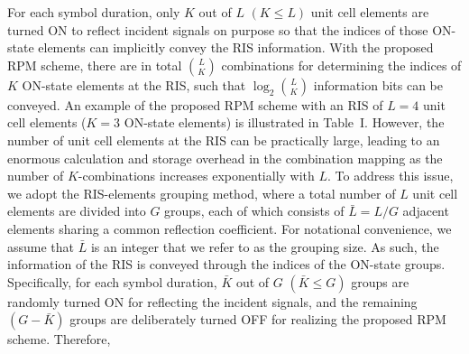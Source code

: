 \documentclass[draftclsnofoot,onecolumn,12pt]{IEEEtran}
\newcommand{\rev}[1]{{\color{red}#1}} %
\newcommand{\rev}[1]{#1}
\begin{document}
For each symbol duration, only $K$ out of $L$ $(K\le L)$ unit cell elements are turned ON to reflect incident signals on purpose so that the indices of those ON-state elements can implicitly convey the RIS information. 
With the proposed RPM scheme, 
there are in total ${{L}\choose{K}} $ combinations for determining the indices of $K$ ON-state elements at the RIS, such that  $\log_2 {{L}\choose{K}}$ information bits can be conveyed. 
An example of the proposed RPM scheme with an RIS of $L=4$ unit cell elements ($K=3$ ON-state elements) is illustrated in Table~I. 
However, the number of unit cell elements at the RIS can be practically large, leading to an enormous calculation and storage overhead in the combination mapping as the number of $K$-combinations increases exponentially with $L$. 
To address this issue, we adopt the RIS-elements grouping method, 
where a total number of $L$ unit cell elements are divided into $G$ groups, each of which consists of ${\bar L}=L/G$ adjacent elements sharing 
a common reflection coefficient. 
For notational convenience, we assume that ${\bar L}$ is an integer that we refer to as the grouping size. 
As such, the information of the RIS is conveyed through the indices of the ON-state groups. Specifically, for each symbol duration, ${\bar K}$ out of $G$ $(\bar{K}\le G)$ groups are randomly turned ON for reflecting the incident signals, and the remaining $(G-\bar K)$ groups are deliberately turned OFF for realizing the proposed RPM scheme. 
Therefore, 
\end{document}
